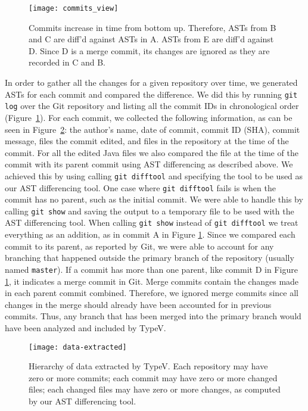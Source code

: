 \begin{figure}[h]
\centering
\texttt{[image: commits\_view]}
\caption{Commits increase in time from bottom up. Therefore, ASTs from B and C are diff'd against ASTs in A. ASTs from E are diff'd against D. Since D is a merge commit, its changes are ignored as they are recorded in C and B.}
\label{fig:commits}
\end{figure}

In order to gather all the changes for a given repository over time, we generated ASTs for each commit and compared the difference. We did this by running \texttt{git log} over the Git repository and listing all the commit IDs in chronological order (Figure~\ref{fig:commits}). For each commit, we collected the following information, as can be seen in Figure~\ref{fig:data-extracted}: the author's name, date of commit, commit ID (SHA), commit message, files the commit edited, and files in the repository at the time of the commit. For all the edited Java files we also compared the file at the time of the commit with its parent commit using AST differencing as described above. We achieved this by using calling \texttt{git difftool} and specifying the tool to be used as our AST differencing tool. One case where \texttt{git difftool} fails is when the commit has no parent, such as the initial commit. We were able to handle this by calling \texttt{git show} and saving the output to a temporary file to be used with the AST differencing tool. When calling \texttt{git show} instead of \texttt{git difftool} we treat everything as an addition, as in commit A in Figure \ref{fig:commits}. Since we compared each commit to its parent, as reported by Git, we were able to account for any branching that happened outside the primary branch of the repository (usually named \texttt{master}). If a commit has more than one parent, like commit D in Figure \ref{fig:commits}, it indicates a merge commit in Git. Merge commits contain the changes made in each parent commit combined. Therefore, we ignored merge commits since all changes in the merge should already have been accounted for in previous commits. Thus, any branch that has been merged into the primary branch would have been analyzed and included by TypeV.

\begin{figure}[h]
\centering
\texttt{[image: data-extracted]}
\caption{Hierarchy of data extracted by TypeV. Each repository may have zero or more commits; each commit may have zero or more changed files; each changed files may have zero or more changes, as computed by our AST differencing tool.}
\label{fig:data-extracted}
\end{figure}

